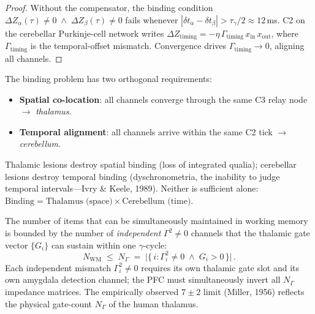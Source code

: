 \documentclass[aps,pre,twocolumn,superscriptaddress,floatfix]{revtex4-2}
\begin{document}
\begin{proof}
Without the compensator, the binding condition
$\Delta Z_\alpha(\tau) \neq 0
\;\wedge\; \Delta Z_\beta(\tau) \neq 0$
fails whenever
$|\delta t_\alpha - \delta t_\beta|
> \tau_\gamma / 2 \approx 12$\,ms.
C2 on the cerebellar Purkinje-cell network writes
$\Delta Z_{\text{timing}} =
-\eta\,\Gamma_{\text{timing}}\,
x_{\text{in}}\,x_{\text{out}}$,
where $\Gamma_{\text{timing}}$ is the
temporal-offset mismatch.
Convergence drives $\Gamma_{\text{timing}} \to 0$,
aligning all channels.
\end{proof}

\begin{remark}
\label{rem:binding-dual}
The binding problem has two orthogonal requirements:
\begin{itemize}
  \item \textbf{Spatial co-location}:
    all channels converge through the same C3 relay
    node $\to$ \emph{thalamus}.
  \item \textbf{Temporal alignment}:
    all channels arrive within the same C2 tick
    $\to$ \emph{cerebellum}.
\end{itemize}
Thalamic lesions destroy spatial binding
(loss of integrated qualia);
cerebellar lesions destroy temporal binding
(dyschronometria, the inability to judge
temporal intervals---Ivry \& Keele, 1989).
Neither is sufficient alone:
$\text{Binding} =
\text{Thalamus (space)} \times
\text{Cerebellum (time)}$.
\end{remark}

\begin{proposition}
\label{prop:working-memory}
The number of items that can be simultaneously
maintained in working memory is bounded by the
number of \emph{independent} $\Gamma^2 \neq 0$
channels that the thalamic gate vector $\{G_i\}$
can sustain within one $\gamma$-cycle:
\begin{equation}
  N_{\text{WM}} \;\leq\; N_\Gamma
  \;=\; \bigl|\bigl\{\,i : \Gamma_i^2 \neq 0
  \;\wedge\; G_i > 0\,\bigr\}\bigr|\,.
  \label{eq:working-memory}
\end{equation}
Each independent mismatch $\Gamma_i^2 \neq 0$
requires its own thalamic gate slot and its own
amygdala detection channel; the PFC must
simultaneously invert all $N_\Gamma$ impedance
matrices.
The empirically observed $7 \pm 2$ limit (Miller,
1956) reflects the physical gate-count
$N_\Gamma$ of the human thalamus.
\end{proposition}
\end{document}

